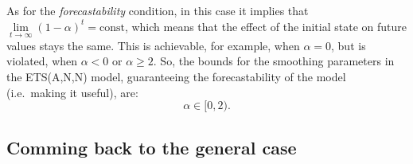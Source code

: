 \documentclass[]{book}
\theoremstyle{definition}
\theoremstyle{definition}
\theoremstyle{definition}
\theoremstyle{definition}
\theoremstyle{remark}
\begin{document}
As for the \emph{forecastability} condition, in this case it implies that \(\lim\limits_{t\rightarrow\infty}(1 -{\alpha})^t = \text{const}\), which means that the effect of the initial state on future values stays the same. This is achievable, for example, when \(\alpha=0\), but is violated, when \(\alpha<0\) or \(\alpha\geq 2\). So, the bounds for the smoothing parameters in the ETS(A,N,N) model, guaranteeing the forecastability of the model (i.e.~making it useful), are:
\begin{equation}
  \alpha \in [0, 2) .
  \label{eq:ETSADAMStateSpaceANNBounds}
\end{equation}

\hypertarget{comming-back-to-the-general-case}{%
\subsection{Comming back to the general case}\label{comming-back-to-the-general-case}}
\end{document}
